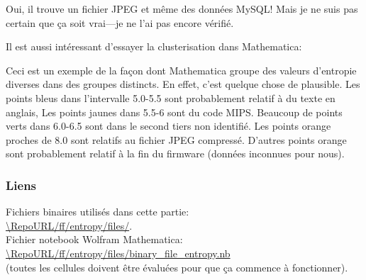 Oui, il trouve un fichier JPEG et même des données MySQL!
Mais je ne suis pas certain que ça soit vrai---je ne l'ai pas encore vérifié.

Il est aussi intéressant d'essayer la clusterisation dans Mathematica:



Ceci est un exemple de la façon dont Mathematica groupe des valeurs d'entropie diverses
dans des groupes distincts.
En effet, c'est quelque chose de plausible.
Les points bleus dans l'intervalle 5.0-5.5 sont probablement relatif à du texte en
anglais,
Les points jaunes dans 5.5-6 sont du code MIPS. Beaucoup de points verts dans 6.0-6.5
sont dans le second tiers non identifié.
Les points orange proches de 8.0 sont relatifs au fichier JPEG compressé.
D'autres points orange sont probablement relatif à la fin du firmware (données inconnues
pour nous).

\subsubsection{Liens}

Fichiers binaires utilisés dans cette partie: \\
\url{\RepoURL/ff/entropy/files/}.\\
Fichier notebook Wolfram Mathematica: \\
\url{\RepoURL/ff/entropy/files/binary_file_entropy.nb} \\
(toutes les cellules doivent être évaluées pour que ça commence à fonctionner).
